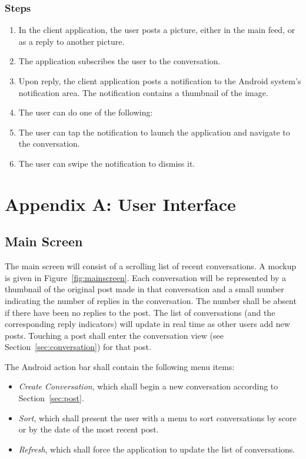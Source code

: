 \documentclass[11pt]{scrartcl}
\let\stdsection\section
\renewcommand\section{\newpage\stdsection}
\begin{document}
        \subsubsection{Steps}
            \begin{enumerate}
                \item In the client application, the user posts a picture, either in the main feed, or as a reply to another picture.
                \item The application subscribes the user to the conversation.
                \item Upon reply, the client application posts a notification to the Android system's notification area.  The notification contains a thumbnail of the image.
                \item The user can do one of the following:
                \item The user can tap the notification to launch the application and navigate to the conversation.
                \item The user can swipe the notification to dismiss it.
            \end{enumerate}

\section*{Appendix A: User Interface}
    \subsection{Main Screen}
        The main screen will consist of a scrolling list of recent conversations.
        A mockup is given in Figure~\ref{fig:mainscreen}.
        Each conversation will be represented by a thumbnail of the original post made in that conversation and a small number indicating the number of replies in the conversation.
        The number shall be absent if there have been no replies to the post.
        The list of conversations (and the corresponding reply indicators) will update in real time as other users add new posts.
        Touching a post shall enter the conversation view (see Section~\ref{sec:conversation}) for that post.

        The Android action bar shall contain the following menu items:

        \begin{itemize}
            \item \emph{Create Conversation}, which shall begin a new conversation according to Section~\ref{sec:post}.
            \item \emph{Sort}, which shall present the user with a menu to sort conversations by score or by the date of the most recent post.
            \item \emph{Refresh}, which shall force the application to update the list of conversations.
        \end{itemize}
\end{document}
